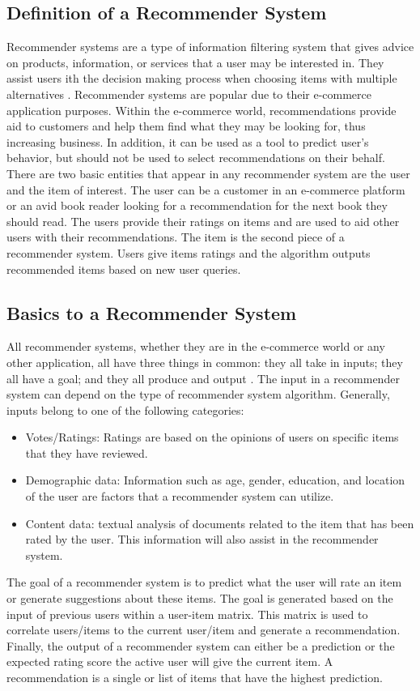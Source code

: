 \subsection{Definition of a Recommender System}
Recommender systems are a type of information filtering system that gives advice on products, information, or services that a user may be interested in. They assist users ith the decision making process when choosing items with multiple alternatives \citep{literature_4}. Recommender systems are popular due to their e-commerce application purposes. Within the e-commerce world, recommendations provide aid to customers and help them find what they may be looking for, thus increasing business. In addition, it can be used as a tool to predict user's behavior, but should not be used to select recommendations on their behalf.
There are two basic entities that appear in any recommender system are the user and the item of interest. The user can be a customer in an e-commerce platform or an avid book reader looking for a recommendation for the next book they should read. The users provide their ratings on items and are used to aid other users with their recommendations. The item is the second piece of a recommender system. Users give items ratings and the algorithm outputs recommended items based on new user queries.
\subsection{Basics to a Recommender System}
All recommender systems, whether they are in the e-commerce world or any other application, all have three things in common: they all take in inputs; they all have a goal; and they all produce and output \citep{literature_5}.
The input in a recommender system can depend on the type of recommender system algorithm. Generally, inputs belong to one of the following categories:
\begin{itemize}
\item {Votes/Ratings: Ratings are based on the opinions of users on specific items that they have reviewed.}
\item {Demographic data: Information such as age, gender, education, and location of the user are factors that a recommender system can utilize.}
\item {Content data: textual analysis of documents related to the item that has been rated by the user. This information will also assist in the recommender system.}
\end{itemize}
The goal of a recommender system is to predict what the user will rate an item or generate suggestions about these items. The goal is generated based on the input of previous users within a user-item matrix. This matrix is used to correlate users/items to the current user/item and generate a recommendation. 
Finally, the output of a recommender system can either be a prediction or the expected rating score the active user will give the current item. A recommendation is a single or list of items that have the highest prediction.

